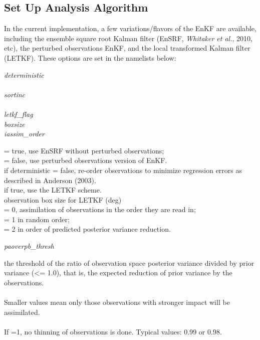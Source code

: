  
\subsection{Set Up Analysis Algorithm}
In the current implementation, a few variations/flavors of the EnKF are available, including the ensemble square root Kalman filter (EnSRF, \textit{Whitaker et al.}, 2010, etc), the perturbed observations EnKF, and the local transformed Kalman filter (LETKF). These options are set in the namelists below:


\begin{minipage}[t]{0.2\textwidth}
\textit{deterministic}\\
\\
\textit{sortinc}\\
\\
\textit{letkf\_flag}\\
\textit{boxsize}\\
\textit{iassim\_order}\\
\end{minipage}
\begin{minipage}[t]{0.8\textwidth}
= true, use EnSRF without perturbed observations;\\
= false, use perturbed observations version of EnKF.  \\
if deterministic = false, re-order observations to 
 minimize regression errors as described in Anderson (2003).  \\
 if true, use the LETKF scheme. \\
 observation box size for LETKF (deg)\\
  = 0, assimilation of observations in the order they are read in; \\
  = 1 in random order; \\
 = 2 in order of predicted posterior variance reduction. \\
\end{minipage}

\begin{minipage}[t]{0.2\textwidth}
\textit{paoverpb\_thresh}\\
\end{minipage}
\begin{minipage}[t]{0.8\textwidth}
 the threshold of the ratio of observation space posterior
 variance divided by prior variance (<= 1.0), that is, the 
expected reduction of prior variance by the observations. \\
  \\
 Smaller values mean only those observations with
 stronger impact will be assimilated. \\
   \\
    If =1, no thinning of observations is done.
   Typical values: 0.99 or 0.98. \\
\end{minipage}


